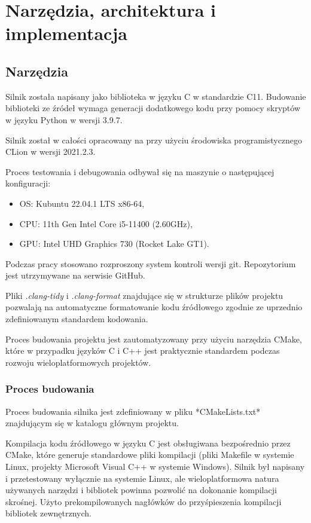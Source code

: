 \chapter{Narzędzia, architektura i implementacja}
\label{chap:algs}

\section{Narzędzia}

Silnik została napisany jako biblioteka w języku C w standardzie C11. Budowanie biblioteki ze źródeł wymaga generacji
dodatkowego kodu przy pomocy skryptów w języku Python w wersji 3.9.7.

Silnik został w całości opracowany na przy użyciu środowiska programistycznego CLion w wersji 2021.2.3.

Proces testowania i debugowania odbywał się na maszynie o następującej konfiguracji:
\begin{itemize}
	\item {OS}: Kubuntu 22.04.1 LTS x86-64,
	\item {CPU}: 11th Gen Intel Core i5-11400 (2.60GHz),
	\item {GPU}: Intel UHD Graphics 730 (Rocket Lake GT1).
\end{itemize}

Podczas pracy stosowano rozproszony system kontroli wersji git. Repozytorium jest utrzymywane na serwisie GitHub.

Pliki \textit{.clang-tidy} i \textit{.clang-format} znajdujące się w strukturze plików projektu pozwalają na automatyczne formatowanie
kodu źródłowego zgodnie ze uprzednio zdefiniowanym standardem kodowania.

Proces budowania projektu jest zautomatyzowany przy użyciu narzędzia CMake, które w przypadku języków C i C++ jest
praktycznie standardem podczas rozwoju wieloplatformowych projektów.

\subsection{Proces budowania}

Proces budowania silnika jest zdefiniowany w pliku *CMakeLists.txt* znajdującym się w katalogu głównym projektu.

Kompilacja kodu źródłowego w języku C jest obsługiwana bezpośrednio przez CMake, które generuje standardowe pliki
kompilacji (pliki Makefile w systemie Linux, projekty Microsoft Visual C++ w systemie Windows).
Silnik był napisany i przetestowany wyłącznie na systemie Linux, ale wieloplatformowa natura używanych narzędzi i bibliotek powinna pozwolić na dokonanie kompilacji skrośnej.
Użyto prekompilowanych nagłówków do przyśpieszenia kompilacji bibliotek zewnętrznych.

